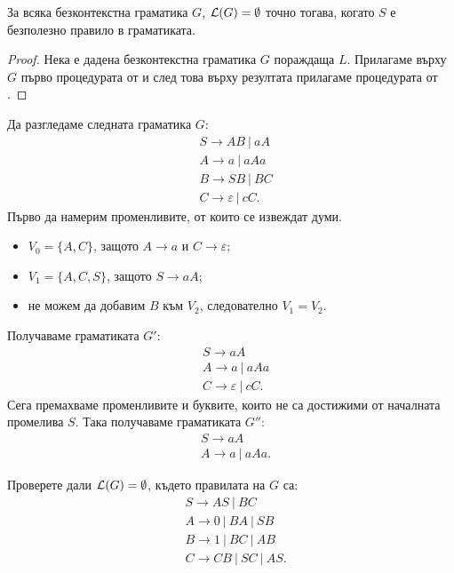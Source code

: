\begin{thm}
  За всяка безконтекстна граматика $G$, $\mathcal{L}(G) = \emptyset$ точно тогава, когато $S$ е безполезно правило в граматиката.
\end{thm}
\begin{proof}
  Нека е дадена безконтекстна граматика $G$ пораждаща $L$.
  Прилагаме върху $G$ първо процедурата от  и след това върху резултата прилагаме процедурата от .
\end{proof}

\begin{example}
  Да разгледаме следната граматика $G$:
  \begin{align*}
    & S \to AB\ |\ aA\\
    & A \to a\ |\ aAa\\
    & B \to SB\ |\ BC\\
    & C \to \varepsilon\ |\ cC.
  \end{align*}
  Първо да намерим променливите, от които се извеждат думи.
  \begin{itemize}
  \item 
    $V_0 = \{A, C\}$, защото $A \to a$ и $C \to \varepsilon$;
  \item
    $V_1 = \{A, C, S\}$, защото $S \to aA$;
  \item
    не можем да добавим $B$ към $V_2$, следователно $V_1 = V_2$.
  \end{itemize}
  Получаваме граматиката $G'$:
  \begin{align*}
    & S \to aA\\
    & A \to a\ |\ aAa\\
    & C \to \varepsilon\ |\ cC.
  \end{align*}
  Сега премахваме променливите и буквите, които не са достижими от началната промелива $S$. Така получаваме граматиката $G''$:
  \begin{align*}
    & S \to aA\\
    & A \to a\ |\ aAa.
  \end{align*}
\end{example}

\begin{problem}
  Проверете дали $\mathcal{L}(G) = \emptyset$, където правилата на $G$ са:
  \begin{align*}
    & S \to AS\ |\ BC\\
    & A \to 0\ |\ BA\ |\ SB\\
    & B \to 1\ |\ BC\ |\ AB\\
    & C \to CB\ |\ SC\ |\ AS.
  \end{align*}
\end{problem}

